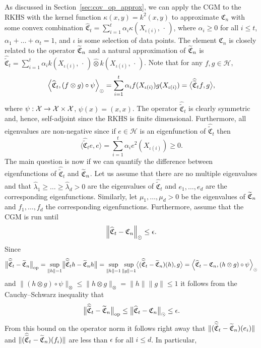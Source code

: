 \documentclass[10pt]{amsart}
\theoremstyle{definition}\newtheorem{defi}[theo]{Definition}\newtheorem{rema}[theo]{Remark}\newtheorem{exam}[theo]{Example}\newtheorem{exem}[theo]{Example}\newtheorem{nota}[theo]{Notation}
\theoremstyle{remark}
\DeclareMathOperator{\opp}{op}
\newcommand{\X}{\mathcal{X}}
\newcommand{\cH}{\mathcal{H}}
\newcommand{\fkC}{\mathfrak{C}}
\newcommand{\wh}{\widehat}
\let\oldtilde\tilde
\renewcommand*{\tilde}[1]{\mathchoice{\widetilde{#1}}{\widetilde{#1}}{\oldtilde{#1}}{\oldtilde{#1}}}
\renewcommand*{\to}{\mathchoice{\longrightarrow}{\rightarrow}{\rightarrow}{\rightarrow}}
\let\originalleft\left
\let\originalright\right
\renewcommand{\left}{\mathopen{}\mathclose\bgroup\originalleft}
\renewcommand{\right}{\aftergroup\egroup\originalright}
\begin{document}
As discussed in Section~\ref{sec:cov_op_approx}, we can apply the CGM to the RKHS with the kernel function $\kappa(x,y) = k^2(x,y)$ to approximate $\fkC_n$ with some convex combination $\wh{\fkC}_t = \sum_{i=1}^t \alpha_i \kappa(X_{\iota(i)},\,\cdot\,)$, where $\alpha_i \geq 0$ for all $i\leq t$, $\alpha_1 + \dots + \alpha_t = 1$, and $\iota$ is some selection of data points. The element $\fkC_n$ is closely related to the operator $\tilde{\fkC}_n$ and a natural approximation of $\tilde{\fkC}_n$ is $\wh{\oldtilde{\fkC}}_t = \sum_{i=1}^t \alpha_i k(X_{\iota(i)}, \,\cdot\,) \wh{\otimes} k(X_{\iota(i)}, \,\cdot\,)$. Note that for any $f,g \in \cH$,
\[
\left\langle \wh{\fkC}_t, (f \otimes g) \circ \psi \right\rangle_\odot = \sum_{i=1}^t \alpha_i f(X_{\iota(i)}) g(X_{\iota(i)}) = \bigl\langle \wh{\oldtilde{\fkC}}_t f, g \bigr\rangle,
\]
where $\psi:\X \to \X \times \X$, $\psi(x) = (x,x)$. The operator $\wh{\oldtilde{\fkC}}_t$ is clearly symmetric and, hence, self-adjoint since the RKHS is finite dimensional. Furthermore, all eigenvalues are non-negative since if $e \in \cH$ is an eigenfunction of $\wh{\oldtilde{\fkC}}_t$ then
\[
\bigl\langle \wh{\oldtilde{\fkC}}_t e, e \bigr\rangle = \sum_{i=1}^t \alpha_i e^2(X_{\iota(i)}) \geq 0.
\]
The main question is now if we can quantify the difference between eigenfunctions of $
\wh{\oldtilde{\fkC}}_t$ and $\tilde{\fkC}_n$. Let us assume that there are no multiple eigenvalues and that $\wh \lambda_1 \geq \dots \geq \wh \lambda_d >0$ are the eigenvalues of $\wh{\oldtilde{\fkC}}_t$ and $e_1,\dots, e_d$ are the corresponding eigenfunctions. Similarly, let $\mu_1,\dots, \mu_d > 0$ be the eigenvalues of $\tilde{\fkC}_n$ and $f_1,\dots, f_d$ the corresponding eigenfunctions. Furthermore, assume that the CGM is run until
\[
\left\| \wh{\fkC}_t - \fkC_n\right\|_\odot \leq \epsilon.
\]
Since
\[
\bigl\|\wh{\oldtilde{\fkC}}_t - \tilde{\fkC}_n \bigr\|_{\opp} = \sup_{\|h\|=1}
\bigl\|\wh{\oldtilde{\fkC}}_t h - \tilde{\fkC}_n h \bigr\| = \sup_{\|h\|=1} \sup_{\|g\|=1}
\bigl\langle (\wh{\oldtilde{\fkC}}_t - \tilde{\fkC}_n)(h), g \bigr\rangle = \left\langle \wh{\fkC}_t - \fkC_n, (h \otimes g) \circ \psi \right\rangle_\odot
\]
and $\|(h \otimes g) \circ \psi \|_\otimes \leq \|h \otimes g\|_\otimes = \|h\|\|g\| \leq 1$ it follows from the Cauchy--Schwarz inequality that
\[
\bigl\|\wh{\oldtilde{\fkC}}_t - \tilde{\fkC}_n \bigr\|_{\opp} \leq \bigl\| \wh{\fkC}_t - \fkC_n\bigr\|_\odot \leq \epsilon.
\]
From this bound on the operator norm it follows right away that $\|(\wh{\oldtilde{\fkC}}_t - \tilde{\fkC}_n) (e_i)\|$ and $\|(\wh{\oldtilde{\fkC}}_t - \tilde{\fkC}_n) (f_i)\|$ are less than $\epsilon$ for all $i\leq d$. In particular,
\end{document}
